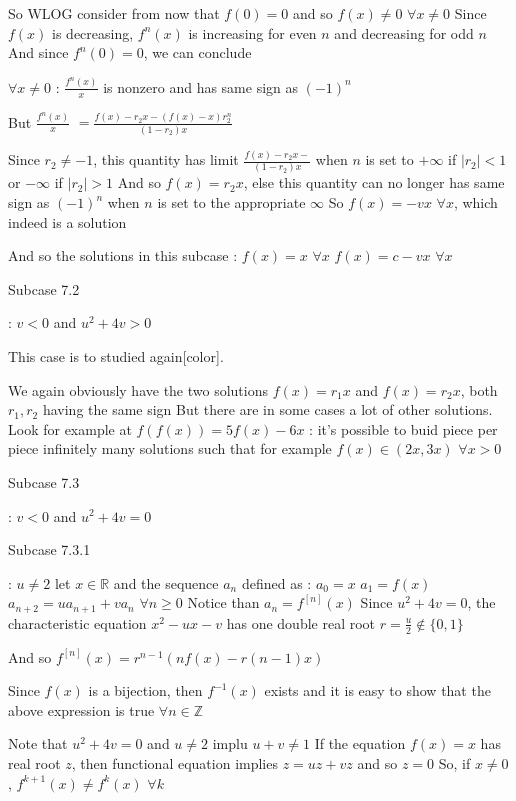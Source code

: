 \begin{solution}
So WLOG consider from now that $f(0)=0$ and so $f(x)\ne 0$ $\forall x\ne 0$
Since $f(x)$ is decreasing, $f^{n}(x)$ is increasing for even $n$ and decreasing for odd $n$
And since $f^{n}(0)=0$, we can conclude

$\forall x\ne 0$ : $\frac{f^{n}(x)}x$ is nonzero and has same sign as $(-1)^n$

But $\frac{f^{n}(x)}x$ $=\frac{f(x)-r_2x-(f(x)-x)r_2^n}{(1-r_2)x}$

Since $r_2\ne -1$, this quantity has limit  $\frac{f(x)-r_2x-}{(1-r_2)x}$ when $n$ is set to $+\infty$ if $|r_2|<1$ or $-\infty$ if $|r_2|>1$
And so $f(x)=r_2x$, else this quantity can no longer has same sign as $(-1)^n$ when $n$ is set to the appropriate $\infty$
So $f(x)=-vx$ $\forall x$, which indeed is a solution

And so the solutions in this subcase :
$f(x)=x$ $\forall x$
$f(x)=c-vx$ $\forall x$

\begin{bolded}Subcase 7.2\end{bolded} : $v<0$ and $u^2+4v>0$
\begin{bolded}[color=red]This case is to studied again[\/color].\end{bolded}
We again obviously have the two solutions $f(x)=r_1x$ and $f(x)=r_2x$, both $r_1,r_2$ having the same sign
But there are in some cases a lot of other solutions.
Look for example at $f(f(x))=5f(x)-6x$ : it's possible to buid piece per piece infinitely many solutions such that for example $f(x)\in(2x,3x)$ $\forall x>0$


\begin{bolded}Subcase 7.3 \end{bolded}: $v<0$ and $u^2+4v=0$
\begin{bolded}Subcase 7.3.1\end{bolded} : $u\ne 2$
let $x\in\mathbb R$ and the sequence $a_n$ defined as :
$a_0=x$
$a_1=f(x)$
$a_{n+2}=ua_{n+1}+va_n$ $\forall n\ge 0$
Notice than $a_n=f^{[n]}(x)$
Since $u^2+4v=0$, the characteristic equation $x^2-ux-v$ has one double real root $r=\frac u2\notin\{0,1\}$

And so $f^{[n]}(x)=r^{n-1}(nf(x)-r(n-1)x)$

Since $f(x)$ is a bijection, then $f^{-1}(x)$ exists and it is easy to show that the above expression is true $\forall n\in\mathbb Z$

Note that $u^2+4v=0$ and $u\ne 2$ implu $u+v\ne 1$
If the equation $f(x)=x$ has real root $z$, then functional equation implies $z=uz+vz$ and so $z=0$
So, if $x\ne 0$, $f^{k+1}(x)\ne f^k(x)$ $\forall k$


\end{solution}
